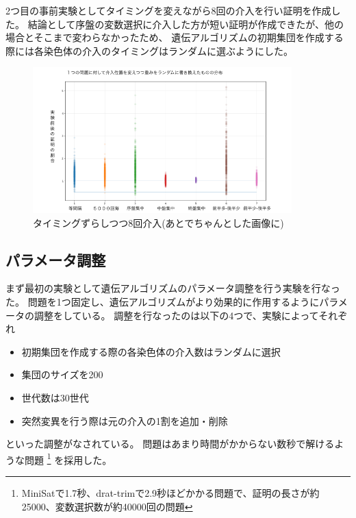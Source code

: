 

2つ目の事前実験としてタイミングを変えながら8回の介入を行い証明を作成した。
結論として序盤の変数選択に介入した方が短い証明が作成できたが、他の場合とそこまで変わらなかったため、
遺伝アルゴリズムの初期集団を作成する際には各染色体の介入のタイミングはランダムに選ぶようにした。

\begin{figure}[h]
    \centering
    \includegraphics[width=10cm]{figures/Experiment0/1.png}
    \caption{タイミングずらしつつ8回介入(あとでちゃんとした画像に)}
\end{figure}





\subsection{パラメータ調整}%



まず最初の実験として遺伝アルゴリズムのパラメータ調整を行う実験を行なった。
問題を1つ固定し、遺伝アルゴリズムがより効果的に作用するようにパラメータの調整をしている。
調整を行なったのは以下の4つで、実験によってそれぞれ
\begin{itemize}
    \item 初期集団を作成する際の各染色体の介入数はランダムに選択
    \item 集団のサイズを200
    \item 世代数は30世代
    \item 突然変異を行う際は元の介入の1割を追加・削除
\end{itemize}
といった調整がなされている。
問題はあまり時間がかからない数秒で解けるような問題
\footnote{MiniSatで1.7秒、drat-trimで2.9秒ほどかかる問題で、証明の長さが約25000、変数選択数が約40000回の問題}
を採用した。



